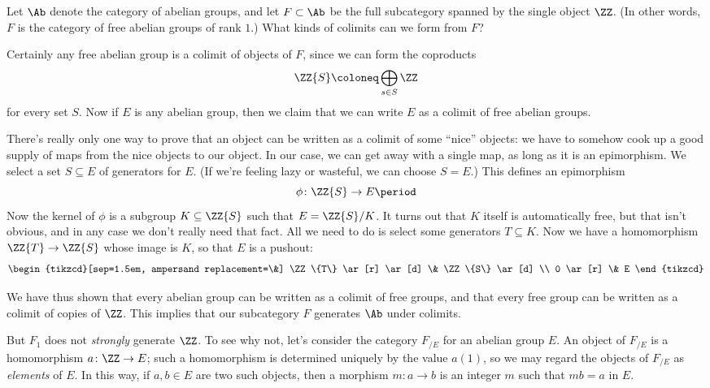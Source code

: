 \begin{eg}
  Let $\Ab$ denote the category of abelian groups, and
  let $F \subset \Ab$ be the full subcategory spanned by the single object $\ZZ$.
  (In other words, $F$ is the category of free abelian groups of rank $1$.)
  What kinds of colimits can we form from $F$?

  Certainly any free abelian group is a colimit of objects of $F$, since we can form the coproducts
  \[
    \ZZ\{S\} \coloneq \bigoplus_{s \in S} \ZZ
  \]
  for every set $S$.
  Now if $E$ is any abelian group, then we claim that we can write $E$ as a colimit of free abelian groups.

  There's really only one way to prove that an object can be written as a colimit of some \enquote{nice} objects:
  we have to somehow cook up a good supply of maps from the nice objects to our object. 
  In our case, we can get away with a single map, as long as it is an epimorphism.
  We select a set $S \subseteq E$ of generators for $E$.
  (If we're feeling lazy or wasteful, we can choose $S = E$.)
  This defines an epimorphism
  \[
    \phi \colon \ZZ\{S\} \to E \period
  \]
  Now the kernel of $\phi$ is a subgroup $K \subseteq \ZZ\{S\}$ such that $E = \ZZ\{S\}/K$.
  It turns out that $K$ itself is automatically free, but
  that isn't obvious, and in any case we don't really need that fact.
  All we need to do is select some generators $T \subseteq K$.
  Now we have a homomorphism $\ZZ\{T\} \to \ZZ\{S\}$ whose image is $K$, so that $E$ is a pushout: 
  \[
    \begin{tikzcd}[sep=1.5em, ampersand replacement=\&]
      \ZZ\{T\} \ar[r] \ar[d] \& \ZZ\{S\} \ar[d] \\
      0        \ar[r]        \& E 
    \end{tikzcd}
  \]
  
  We have thus shown that every abelian group can be written as a colimit of free groups, and that every free group can be written as a colimit of copies of $\ZZ$.
  This implies that our subcategory $F$ generates $\Ab$ under colimits.

  But $F_1$ does not \emph{strongly} generate $\ZZ$.
  To see why not, let's consider the category $F_{/E}$ for an abelian group $E$.
  An object of $F_{/E}$ is a homomorphism $a \colon \ZZ \to E$;
  such a homomorphism is determined uniquely by the value $a(1)$, so we may regard the objects of $F_{/E}$ as \emph{elements} of $E$.
  In this way, if $a, b \in E$ are two such objects, then
  a morphism $m \colon a \to b$ is an integer $m$ such that $mb = a$ in $E$.
\end{eg}

